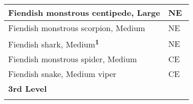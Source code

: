 \begin{longtable}{llll}
\hline
\multicolumn{1}{|p{3.326in}|}{\begin{minipage}[t]{3.326in}\raggedright
Fiendish monstrous centipede, Large\end{minipage}} & \multicolumn{3}{p{0.601in}|}{\begin{minipage}[t]{0.601in}\raggedright
NE\end{minipage}}\\
\hline
\multicolumn{1}{|p{3.326in}|}{\begin{minipage}[t]{3.326in}\raggedright
Fiendish monstrous scorpion, Medium\end{minipage}} & \multicolumn{3}{p{0.601in}|}{\begin{minipage}[t]{0.601in}\raggedright
NE\end{minipage}}\\
\hline
\multicolumn{1}{|p{3.326in}|}{\begin{minipage}[t]{3.326in}\raggedright
Fiendish shark, Medium\textsuperscript{\textbf{1}}\end{minipage}} & \multicolumn{3}{p{0.601in}|}{\begin{minipage}[t]{0.601in}\raggedright
NE\end{minipage}}\\
\hline
\multicolumn{1}{|p{3.326in}|}{\begin{minipage}[t]{3.326in}\raggedright
Fiendish monstrous spider, Medium\end{minipage}} & \multicolumn{3}{p{0.601in}|}{\begin{minipage}[t]{0.601in}\raggedright
CE\end{minipage}}\\
\hline
\multicolumn{1}{|p{3.326in}|}{\begin{minipage}[t]{3.326in}\raggedright
Fiendish snake, Medium viper\end{minipage}} & \multicolumn{3}{p{0.601in}|}{\begin{minipage}[t]{0.601in}\raggedright
CE\end{minipage}}\\
\hline
\multicolumn{1}{|p{3.326in}|}{\begin{minipage}[t]{3.326in}\raggedright
\textbf{3rd Level}\end{minipage}} & \multicolumn{3}{p{0.601in}|}{\begin{minipage}[t]{0.601in}\raggedright
\end{minipage}}\\
\hline
\multicolumn{1}{|p{3.326in}|}{\begin{minipage}[t]{3.326in}\raggedright

\end{minipage}}
\end{longtable}
